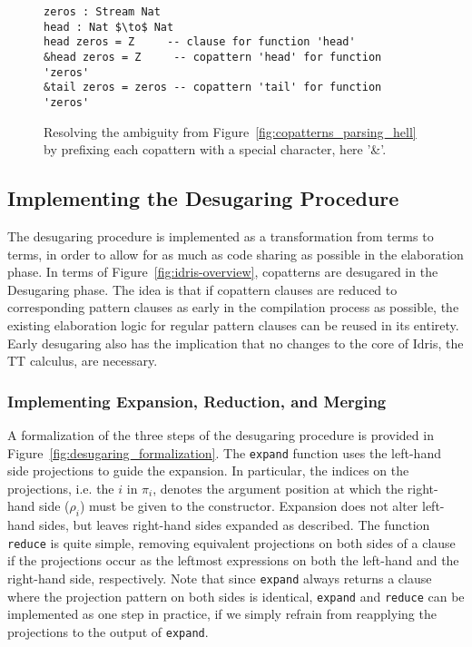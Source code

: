 \begin{figure}
\begin{lstlisting}[mathescape]
zeros : Stream Nat
head : Nat $\to$ Nat
head zeros = Z     -- clause for function 'head'
&head zeros = Z     -- copattern 'head' for function 'zeros'
&tail zeros = zeros -- copattern 'tail' for function 'zeros'
\end{lstlisting}
  \caption{Resolving the ambiguity from Figure~\ref{fig:copatterns_parsing_hell}
  by prefixing each copattern with a special character, here '\&'.}
  \label{fig:copatterns_parsing_hell_fixed_ampersand}
\end{figure}

\subsection{Implementing the Desugaring Procedure}
The desugaring procedure is implemented as a transformation from \IdrisM{} terms
to \IdrisM{} terms, in order to allow for as much as code sharing as possible in
the elaboration phase. In terms of Figure~\ref{fig:idris-overview}, copatterns
are desugared in the Desugaring phase. The idea is that if copattern clauses are
reduced to corresponding pattern clauses as early in the compilation process as
possible, the existing elaboration logic for regular pattern clauses can be
reused in its entirety. Early desugaring also has the implication that no
changes to the core of Idris, the TT calculus, are necessary.

\subsubsection{Implementing Expansion, Reduction, and Merging}
A formalization of the three steps of the desugaring procedure is provided in
Figure~\ref{fig:desugaring_formalization}. The \texttt{expand} function uses the
left-hand side projections to guide the expansion. In particular, the indices on
the projections, i.e. the $i$ in $\pi_i$, denotes the argument position at which
the right-hand side ($\rho_i$) must be given to the constructor. Expansion does
not alter left-hand sides, but leaves right-hand sides expanded as
described. The function \texttt{reduce} is quite simple, removing equivalent
projections on both sides of a clause if the projections occur as the leftmost
expressions on both the left-hand and the right-hand side, respectively. Note that since
\texttt{expand} always returns a clause where the projection pattern on both
sides is identical, \texttt{expand} and \texttt{reduce} can be implemented as
one step in practice, if we simply refrain from reapplying the projections to the
output of \texttt{expand}.

